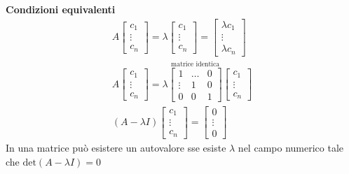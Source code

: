 \documentclass[italian]{article}
\renewcommand{\det}[1]{\text{det$\left(#1\right)$}}
\begin{document}
\noindent
\textbf{Condizioni equivalenti}\\
\begin{gather*}
		A\begin{bmatrix}c_1 \\ \vdots \\ c_n\end{bmatrix} = \lambda \begin{bmatrix}c_1 \\ \vdots \\ c_n\end{bmatrix} = \begin{bmatrix}\lambda c_1 \\ \vdots \\ \lambda c_n\end{bmatrix} \\[2mm]
	A\begin{bmatrix}c_1 \\ \vdots \\ c_n\end{bmatrix}	= \lambda
		\overset{\text{matrice identica}}{
			\begin{bmatrix}
				1  & \dots & 0 \\
				\vdots & 1 &  0 \\
				0 & 0 & 1
			\end{bmatrix}
		}
		\begin{bmatrix}c_1 \\ \vdots \\ c_n\end{bmatrix}\\[2mm]
	(A - \lambda I)\begin{bmatrix}c_1 \\ \vdots \\ c_n\end{bmatrix} = \begin{bmatrix}0 \\ \vdots \\ 0\end{bmatrix}
\end{gather*}
In una matrice può esistere un autovalore sse esiste $\lambda$ nel campo numerico tale che $\det{A - \lambda I} = 0$
\end{document}
